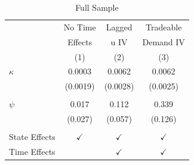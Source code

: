 \documentclass[english,xcolor=svgnames]{beamer}
\begin{document}
\begin{frame} \label{full_sample_estimates}
	\begin{table}[t]
		\centering 
		\small
		\caption{Full Sample} \vspace{-5pt}
		\begin{tabular}{lccc} 
			\toprule\hline 
			&  No Time & Lagged & Tradeable \\
			&  Effects & u IV & Demand IV \\
			\cmidrule(r){2-4}
			& (1) & (2) & (3) \\
			
			
			$\kappa$      &      0.0003   &     0.0062   &      0.0062  \\
			&      (0.0019)   &    (0.0028)  &    (0.0025)  \\
			\\ [-2mm] 
			
			$\psi$      &         0.017   &     0.112   &    0.339  \\
			&      (0.027)   &    (0.057)   &     (0.126)  \\
			\\ [-2mm]
			
			\cmidrule(r){2-4}
			State Effects &  $\checkmark$ & $\checkmark$ & $\checkmark$ \\
			Time Effects & & $\checkmark$ & $\checkmark$ \\
			\bottomrule
		\end{tabular}
	\end{table}\vspace{10pt}
\end{frame}
\end{document}
